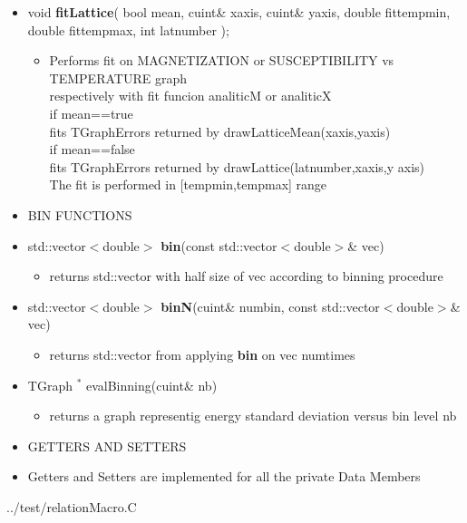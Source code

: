 \begin{itemize}
\begin{itemize}
  \item[] void \textbf{fitLattice}( bool mean,
    cuint\& x\textunderscore axis,
    cuint\& y\textunderscore axis,
    double fit\textunderscore temp\textunderscore min,
    double fit\textunderscore temp\textunderscore max,
    int lat\textunderscore number
    );
    \begin{itemize}
    \item[] Performs fit on MAGNETIZATION or SUSCEPTIBILITY vs TEMPERATURE graph\\
			respectively with fit funcion analiticM or analiticX \\    
    		if mean==true\\
    		fits TGraphErrors returned by drawLatticeMean(x\textunderscore axis,y\textunderscore axis)\\
    		if mean==false\\
    		fits TGraphErrors returned by drawLattice(lat\textunderscore number,x\textunderscore axis,y					\textunderscore axis)\\
    		The fit is performed in [temp\textunderscore min,temp\textunderscore max] range
    \end{itemize}


  \item[] BIN FUNCTIONS \\

  \item[] std::vector$<$double$>$ \textbf{bin}(const std::vector$<$double$>$\& vec)
    \begin{itemize}
    \item[] returns std::vector with half size of vec according to binning procedure
    \end{itemize}
    
  \item[] std::vector$<$double$>$ \textbf{binN}(cuint\& num\textunderscore bin, const std::vector$<$double$>$\& vec)
    \begin{itemize}
    \item[] returns std::vector from applying \textbf{bin} on vec num\textunderscore times 
    \end{itemize}
    
  \item[] TGraph ${}^*$ evalBinning(cuint\& nb)
	\begin{itemize}
    \item[] returns a graph representig energy standard deviation versus bin level nb
    \end{itemize}
    
    
  \item[] GETTERS AND SETTERS \\

  \item[] Getters and Setters are implemented for all the private Data Members 
  
  \end{itemize}
\end{itemize}

\newpage


{../test/relationMacro.C}

